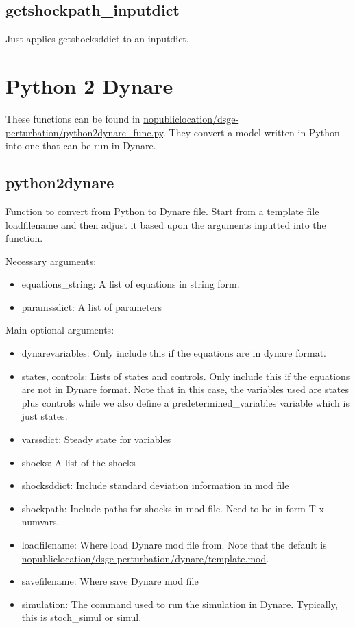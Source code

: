\documentclass{article}
\theoremstyle{definition}
\begin{document}
\subsection{getshockpath\_inputdict}
Just applies getshocksddict to an inputdict.

\section{Python 2 Dynare}
These functions can be found in \url{nopubliclocation/dsge-perturbation/python2dynare_func.py}. They convert a model written in Python into one that can be run in Dynare.

\subsection{python2dynare}
Function to convert from Python to Dynare file. Start from a template file loadfilename and then adjust it based upon the arguments inputted into the function.

Necessary arguments:
\begin{itemize}
    \item equations\_string: A list of equations in string form.
    \item paramssdict: A list of parameters
\end{itemize}

Main optional arguments:
\begin{itemize}
    \item dynarevariables: Only include this if the equations are in dynare format.
    \item states, controls: Lists of states and controls. Only include this if the equations are not in Dynare format. Note that in this case, the variables used are states plus controls while we also define a predetermined\_variables variable which is just states.
    \item varssdict: Steady state for variables
    \item shocks: A list of the shocks
    \item shocksddict: Include standard deviation information in mod file
    \item shockpath: Include paths for shocks in mod file. Need to be in form T x numvars.
    \item loadfilename: Where load Dynare mod file from. Note that the default is \url{nopubliclocation/dsge-perturbation/dynare/template.mod}.
    \item savefilename: Where save Dynare mod file
    \item simulation: The command used to run the simulation in Dynare. Typically, this is stoch\_simul or simul.
\end{itemize}
\end{document}

